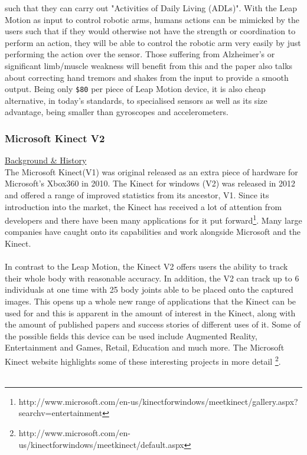 \documentclass[11pt]{report}
\begin{document}
such that they can carry out "Activities of Daily Living (ADLs)".
With the Leap Motion as input to control robotic arms, humans
actions can be mimicked by the users such that if they would otherwise not 
have the strength or coordination to perform an action, they will be able to control
the robotic arm very easily by just performing the action over the sensor. 
Those suffering from Alzheimer's or significant limb/muscle
weakness will benefit from this and the paper also talks about correcting hand
tremors and shakes from the input to provide a smooth output. 
Being only \texttt{\$80} per piece of Leap Motion device, it is 
also cheap alternative, in today's standards, to specialised sensors as well 
as its size advantage, being smaller than gyroscopes and accelerometers.  

\subsubsection*{Microsoft Kinect V2}
\underline{Background \& History}\\
The Microsoft Kinect(V1) was original released as an extra piece of hardware
for Microsoft's Xbox360 in 2010. The Kinect for windows (V2) was released
in 2012 and offered a range of improved statistics from its ancestor,
V1. Since its introduction into the market, the Kinect has received a lot of
attention from developers and there have been many applications for it put
forward\footnote{http://www.microsoft.com/en-us/kinectforwindows/meetkinect/gallery.aspx?searchv=entertainment}.
Many large companies have caught onto its capabilities and work 
alongside Microsoft and the Kinect.
\\ \\
In contrast to the Leap Motion, the Kinect V2 offers users the ability to track their 
whole body with reasonable accuracy. In addition, the V2 can track up to 6 individuals
at one time with 25 body joints able to be placed onto the captured images.
This opens up a whole new range of applications
that the Kinect can be used for and this is apparent in the amount of interest in the
Kinect, along with the amount of published papers and success stories of different
uses of it. Some of the possible fields this device can be used include 
Augmented Reality, Entertainment and Games, Retail, Education and much more. The 
Microsoft Kinect website highlights some of these interesting projects in more detail
\footnote{http://www.microsoft.com/en-us/kinectforwindows/meetkinect/default.aspx}.
\\ \\ 
\end{document}
